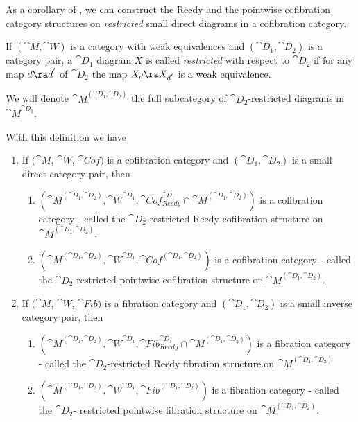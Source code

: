As a corollary of , we can construct the Reedy and the pointwise cofibration category structures on {\it restricted} small direct diagrams in a cofibration category. 

\begin{defn}
\label{defn::restricteddiagrams}
If $({\cat M}, {\cat W})$ is a category with weak equivalences and $({\cat D_1}, {\cat D_2})$ is a category pair, a ${\cat D_1}$ diagram $X$ is called {\it restricted} with respect to ${\cat D_2}$ if for any map $d \ra d^{'}$ of ${\cat D}_2$ the map $X_{d} \ra X_{d^{'}}$ is a weak equivalence. 

We will denote ${\cat M}^{({\cat D_1}, {\cat D_2})}$ the full subcategory of ${\cat D}_2$-restricted diagrams in ${\cat M}^{{\cat D_1}}$.
\end{defn}

With this definition we have

\begin{thm}
\label{thm:reedycofibstruct2}
\mbox{}
\begin{enumerate}
\item
If $({\cat M}$, ${\cat W}$, ${\cat Cof})$ is a cofibration category and $({\cat D}_1, {\cat D}_2)$ is a small direct category pair, then
\begin{enumerate}
\item
$({\cat M}^{({\cat D}_1, {\cat D}_2)} , {\cat W}^{{\cat D}_1}, {\cat Cof}^{{\cat D}_1}_{Reedy} \cap {\cat M}^{({\cat D}_1, {\cat D}_2)})$ is a cofibration category - called the ${\cat D}_2$-restricted Reedy cofibration structure on ${\cat M}^{({\cat D}_1, {\cat D}_2)}$.
\item
$({\cat M}^{({\cat D}_1, {\cat D}_2)} , {\cat W}^{{\cat D}_1}, {\cat Cof}^{({\cat D}_1, {\cat D}_2)})$ is a cofibration category - called the ${\cat D}_2$-restricted pointwise cofibration structure on ${\cat M}^{({\cat D}_1, {\cat D}_2)}$.
\end{enumerate}
\item
If $({\cat M}$, ${\cat W}$, ${\cat Fib})$ is a fibration category and $({\cat D}_1, {\cat D}_2)$ is a small inverse category pair, then
\begin{enumerate}
\item
$({\cat M}^{({\cat D}_1, {\cat D}_2)} , {\cat W}^{{\cat D}_1}, {\cat Fib}^{{\cat D}_1}_{Reedy} \cap {\cat M}^{({\cat D}_1, {\cat D}_2)})$ is a fibration category - called the ${\cat D}_2$-restricted Reedy fibration structure.on ${\cat M}^{({\cat D}_1, {\cat D}_2)}$
\item
$({\cat M}^{({\cat D}_1, {\cat D}_2)} , {\cat W}^{{\cat D}_1}, {\cat Fib}^{({\cat D}_1, {\cat D}_2)})$ is a fibration category - called the ${\cat D}_2$- restricted pointwise fibration structure on ${\cat M}^{({\cat D}_1, {\cat D}_2)}$.
\end{enumerate}
\end{enumerate}
\end{thm}

